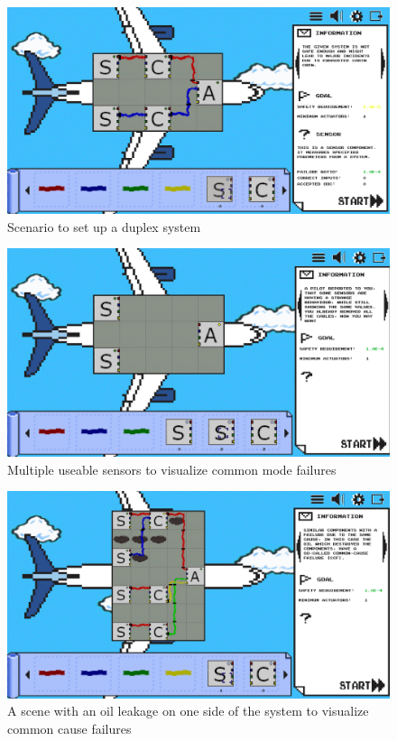 \begin{figure}
    \centering
    \includegraphics[width=\textwidth]{Pictures/res/implementation/scenes/duplex-scene}
    \caption{Scenario to set up a duplex system}
    \label{fig:duplex-system}
\end{figure}
\begin{figure}
    \centering
    \includegraphics[width=\textwidth]{Pictures/res/implementation/scenes/cmf}
    \caption{Multiple useable sensors to visualize common mode failures}
    \label{fig:common-mode-scene}
\end{figure}
\begin{figure}
    \centering
    \includegraphics[width=\textwidth]{Pictures/res/implementation/scenes/oil-leak}
    \caption{A scene with an oil leakage on one side of the system to visualize common cause failures}
    \label{fig:common-cause-scene}
\end{figure}

